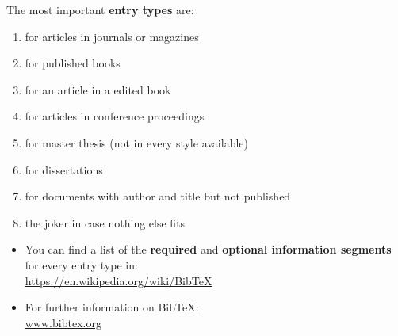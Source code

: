 \begin{frame}[fragile]


The most important \textbf{entry types} are:

\begin{enumerate}
\item \textbf{} for articles in journals or magazines
\item \textbf{} for published books
\item \textbf{} for an article in a edited book
\item \textbf{} for articles in conference proceedings
\item \textbf{} for master thesis (not in every style available)
\item \textbf{} for dissertations
\item \textbf{} for documents with author and title but not published
\item \textbf{} the joker in case nothing else fits
\end{enumerate}

\pause 

\begin{itemize}

\item You can find a list of the \textbf{required} and \textbf{optional information segments} for every entry type in:\\
\url{https://en.wikipedia.org/wiki/BibTeX}

%

\item For further information on Bib\TeX :\\
\url{www.bibtex.org}
\end{itemize}

\end{frame}


